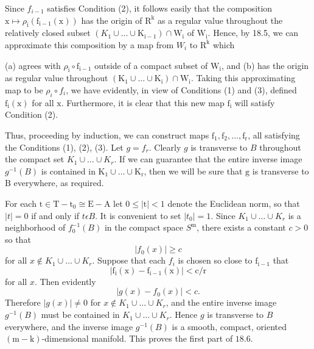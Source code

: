 \documentclass[10pt]{article}
\begin{document}
Since $f_{i-1}$ satisfies Condition (2), it follows easily that the composition $\mathrm{x} \mapsto \rho_{\mathrm{i}}\left(\mathrm{f}_{\mathrm{i}-1}(\mathrm{x})\right)$ has the origin of $\mathrm{R}^{\mathrm{k}}$ as a regular value throughout the relatively closed subset $\left(K_{1} \cup \ldots \cup \mathrm{K}_{\mathrm{i}-1}\right) \cap \mathrm{W}_{\mathrm{i}}$ of $\mathrm{W}_{\mathrm{i}}$. Hence, by 18.5, we can approximate this composition by a map from $W_{i}$ to $\mathrm{R}^{\mathrm{k}}$ which

(a) agrees with $\rho_{\mathrm{i}} \circ \mathrm{f}_{\mathrm{i}-1}$ outside of a compact subset of $\mathrm{W}_{\mathrm{i}}$, and (b) has the origin as regular value throughout $\left(\mathrm{K}_{1} \cup \ldots \cup \mathrm{K}_{\mathrm{i}}\right) \cap \mathrm{W}_{\mathrm{i}}$. Taking this approximating map to be $\rho_{i} \circ f_{i}$, we have evidently, in view of Conditions (1) and (3), defined $\mathrm{f}_{\mathrm{i}}(\mathrm{x})$ for all $\mathrm{x}$. Furthermore, it is clear that this new map $\mathrm{f}_{\mathrm{i}}$ will satisfy Condition (2).

Thus, proceeding by induction, we can construct maps $\mathrm{f}_{1}, \mathrm{f}_{2}, \ldots, \mathrm{f}_{\mathrm{r}}$, all satisfying the Conditions (1), (2), (3). Let $g=f_{r}$. Clearly $g$ is transverse to $B$ throughout the compact set $K_{1} \cup \ldots \cup K_{r}$. If we can guarantee that the entire inverse image $g^{-1}(B)$ is contained in $\mathrm{K}_{1} \cup \ldots \cup \mathrm{K}_{\mathrm{r}}$, then we will be sure that $\mathrm{g}$ is transverse to $\mathrm{B}$ everywhere, as required.

For each $\mathrm{t} \in \mathrm{T}-\mathrm{t}_{0} \cong \mathrm{E}-\mathrm{A}$ let $0 \leq|\mathrm{t}|<1$ denote the Euclidean norm, so that $|t|=0$ if and only if $t \epsilon B$. It is convenient to set $\left|t_{0}\right|=1$. Since $K_{1} \cup \ldots \cup K_{r}$ is a neighborhood of $f_{0}^{-1}(B)$ in the compact space $S^{\mathrm{m}}$, there exists a constant $c>0$ so that
$$
\left|f_{0}(x)\right| \geq c
$$
for all $x \notin K_{1} \cup \ldots \cup K_{r}$. Suppose that each $f_{i}$ is chosen so close to $\mathrm{f}_{\mathrm{i}-1}$ that
$$
\left|\mathrm{f}_{\mathrm{i}}(\mathrm{x})-\mathrm{f}_{\mathrm{i}-1}(\mathrm{x})\right|<\mathrm{c} / \mathrm{r}
$$
for all $x$. Then evidently
$$
\left|g(x)-f_{0}(x)\right|<c .
$$
Therefore $|g(x)| \neq 0$ for $x \notin K_{1} \cup \ldots \cup K_{r}$, and the entire inverse image $g^{-1}(B)$ must be contained in $K_{1} \cup \ldots \cup K_{r}$. Hence $g$ is transverse to $B$ everywhere, and the inverse image $g^{-1}(B)$ is a smooth, compact, oriented $(\mathrm{m}-\mathrm{k})$-dimensional manifold. This proves the first part of $18.6$.
\end{document}
